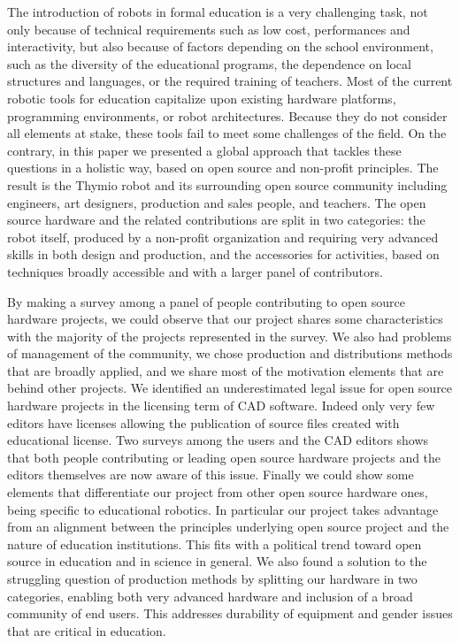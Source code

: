 \documentclass[letterpaper, 10 pt, conference]{ieeeconf}  %
\begin{document}
The introduction of robots in formal education is a very challenging task, not only because of technical requirements such as low cost, performances and interactivity, but also because of factors depending on the school environment, such as the diversity of the educational programs, the dependence on local structures and languages, or the required training of teachers.
Most of the current robotic tools for education capitalize upon existing hardware platforms, programming environments, or robot architectures.
Because they do not consider all elements at stake, these tools fail to meet some challenges of the field.
On the contrary, in this paper we presented a global approach that tackles these questions in a holistic way, based on open source and non-profit principles.
The result is the Thymio robot and its surrounding open source community including engineers, art designers, production and sales people, and teachers.
The open source hardware and the related contributions are split in two categories: the robot itself, produced by a non-profit organization and requiring very advanced skills in both design and production, and the accessories for activities, based on techniques broadly accessible and with a larger panel of contributors.

By making a survey among a panel of people contributing to open source hardware projects, we could observe that our project shares some characteristics with the majority of the projects represented in the survey. 
We also had problems of management of the community, we chose production and distributions methods that are broadly applied, and we share most of the motivation elements that are behind other projects.
We identified an underestimated legal issue for open source hardware projects in the licensing term of CAD software.
Indeed only very few editors have licenses allowing the publication of source files created with educational license.
Two surveys among the users and the CAD editors shows that both people contributing or leading open source hardware projects and the editors themselves are now aware of this issue.
Finally we could show some elements that differentiate our project from other open source hardware ones, being specific to educational robotics.
In particular our project takes advantage from an alignment between the principles underlying open source project and the nature of education institutions. 
This fits with a political trend toward open source in education and in science in general.
We also found a solution to the struggling question of production methods by splitting our hardware in two categories, enabling both very advanced hardware and inclusion of a broad community of end users.
This addresses durability of equipment and gender issues that are critical in education.
\end{document}
